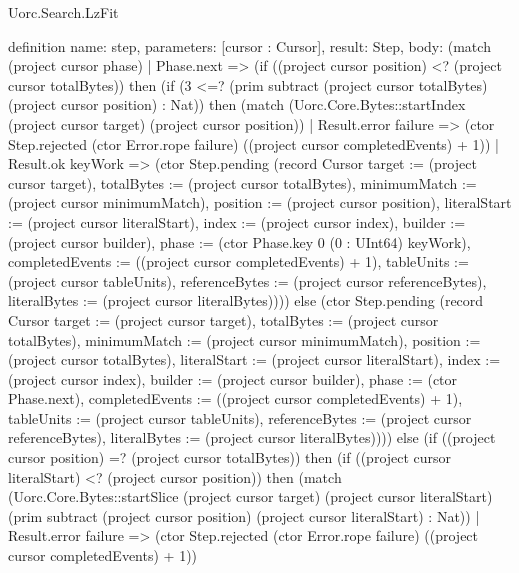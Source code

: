 \begin{lexlean}{Uorc.Search.LzFit}
\begin{semanticmodule}
definition{
  name: step,
  parameters: [cursor : Cursor],
  result: Step,
  body: (match (project cursor phase)
    | Phase.next => (if ((project cursor position) <? (project cursor totalBytes)) then (if (3 <=? (prim subtract (project cursor totalBytes) (project cursor position) : Nat)) then (match (Uorc.Core.Bytes::startIndex (project cursor target) (project cursor position))
      | Result.error failure => (ctor Step.rejected (ctor Error.rope failure) ((project cursor completedEvents) + 1))
      | Result.ok keyWork => (ctor Step.pending (record Cursor {target := (project cursor target), totalBytes := (project cursor totalBytes), minimumMatch := (project cursor minimumMatch), position := (project cursor position), literalStart := (project cursor literalStart), index := (project cursor index), builder := (project cursor builder), phase := (ctor Phase.key 0 (0 : UInt64) keyWork), completedEvents := ((project cursor completedEvents) + 1), tableUnits := (project cursor tableUnits), referenceBytes := (project cursor referenceBytes), literalBytes := (project cursor literalBytes)}))) else (ctor Step.pending (record Cursor {target := (project cursor target), totalBytes := (project cursor totalBytes), minimumMatch := (project cursor minimumMatch), position := (project cursor totalBytes), literalStart := (project cursor literalStart), index := (project cursor index), builder := (project cursor builder), phase := (ctor Phase.next), completedEvents := ((project cursor completedEvents) + 1), tableUnits := (project cursor tableUnits), referenceBytes := (project cursor referenceBytes), literalBytes := (project cursor literalBytes)}))) else (if ((project cursor position) =? (project cursor totalBytes)) then (if ((project cursor literalStart) <? (project cursor position)) then (match (Uorc.Core.Bytes::startSlice (project cursor target) (project cursor literalStart) (prim subtract (project cursor position) (project cursor literalStart) : Nat))
      | Result.error failure => (ctor Step.rejected (ctor Error.rope failure) ((project cursor completedEvents) + 1))
}
\end{semanticmodule}
\end{lexlean}
